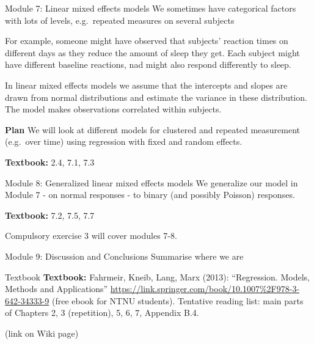 \documentclass[
  ignorenonframetext,
]{beamer}
\begin{document}
\begin{frame}
\begin{block}{Module 7: Linear mixed effects models}
\label{module-7-linear-mixed-effects-models}
We sometimes have categorical factors with lots of levels, e.g.~repeated
measures on several subjects

For example, someone might have observed that subjects' reaction times
on different days as they reduce the amount of sleep they get. Each
subject might have different baseline reactions, nad might also respond
differently to sleep.

In linear mixed effects models we assume that the intercepts and slopes
are drawn from normal distributions and estimate the variance in these
distribution. The model makes observations correlated within subjects.

\textbf{Plan} We will look at different models for clustered and
repeated measurement (e.g.~over time) using regression with fixed and
random effects.

\textbf{Textbook:} 2.4, 7.1, 7.3
\end{block}
\end{frame}

\begin{frame}
\begin{block}{Module 8: Generalized linear mixed effects models}
\label{module-8-generalized-linear-mixed-effects-models}
We generalize our model in Module 7 - on normal responses - to binary
(and possibly Poisson) responses.

\textbf{Textbook:} 7.2, 7.5, 7.7

Compulsory exercise 3 will cover modules 7-8.
\end{block}
\end{frame}

\begin{frame}
\begin{block}{Module 9: Discussion and Conclusions}
\label{module-9-discussion-and-conclusions}
Summarise where we are
\end{block}
\end{frame}

\begin{frame}{Textbook}
\label{textbook}
\textbf{Textbook:} Fahrmeir, Kneib, Lang, Marx (2013): ``Regression.
Models, Methods and Applications''
\url{https://link.springer.com/book/10.1007\%2F978-3-642-34333-9} (free
ebook for NTNU students). Tentative reading list: main parts of Chapters
2, 3 (repetition), 5, 6, 7, Appendix B.4.

\begin{block}{(link on Wiki page)}
\label{link-on-wiki-page}
\end{block}
\end{frame}
\end{document}
